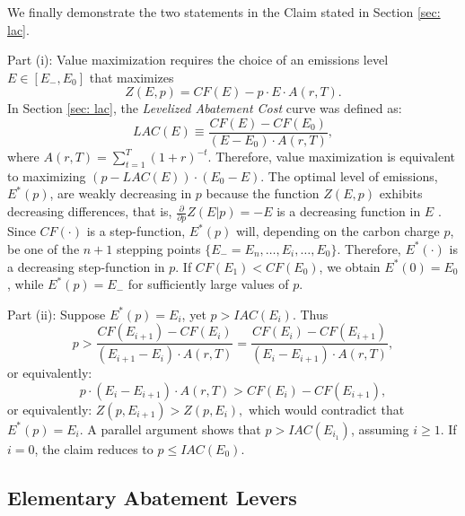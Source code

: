 \documentclass[12pt, a4paper]{article} %
\newcommand{\noin}{\noindent}
\begin{document}
\bigskip
\noin We finally demonstrate the two statements in the Claim stated in Section \ref{sec: lac}.

\noin Part (i): Value maximization requires the choice of an emissions level $E \in [E_-, E_0]$ that maximizes
$$Z(E, p) = CF(E) - p \cdot E \cdot A(r, T).$$
In Section \ref{sec: lac}, the \emph{Levelized Abatement Cost} curve was defined as:
\begin{equation*}
LAC(E) \equiv \frac{CF(E) - CF(E_0)}{(E - E_0) \cdot A(r,T)},
\end{equation*}
\noindent where $A(r,T) = \sum_{t=1}^{T}(1+r)^{-t}$. Therefore, value maximization is equivalent to maximizing $(p - LAC(E)) \cdot (E_0- E)$. The optimal level of emissions, $E^*(p)$, are weakly decreasing in $p$ because the function $Z(E,p)$ exhibits decreasing differences, that is, $\frac{\partial}{\partial p} Z(E|p)= -E$ is a decreasing function in $E$ \citep{mas-collel1995microeconomic}. Since $CF(\cdot)$ is a step-function, $E^*(p)$ will, depending on the carbon charge $p$, be one of the $n+1$ stepping points $\{E_- = E_n, \ldots, E_i, \ldots, E_0\}$. Therefore, $E^*(\cdot)$ is a decreasing step-function in $p$. If $CF(E_1) < CF(E_0)$, we obtain $E^*(0) = E_0$, while $E^*(p)=E_-$ for sufficiently large values of $p$.

\noin Part (ii): Suppose $E^*(p)= E_i$, yet $p > IAC(E_{i})$. Thus
$$ p > \frac{CF(E_{i+1}) - CF(E_{i})}{(E_{i+1}-E_i) \cdot A(r,T)} = \frac{CF(E_{i}) - CF(E_{i+1})}{(E_{i}-E_{i+1}) \cdot A(r,T)},$$
or equivalently:
$$ p\cdot (E_{i}-E_{i+1}) \cdot A(r,T) > CF(E_{i}) - CF(E_{i+1}),$$
or equivalently: $Z(p, E_{i+1}) > Z(p, E_{i}),$ which would contradict that $E^*(p)= E_i$. A parallel argument shows that $p > IAC(E_{i_1})$, assuming $i \geq 1$. If $i=0$, the claim reduces to $p \leq IAC(E_{0})$.


\subsection*{Elementary Abatement Levers}
\end{document}
